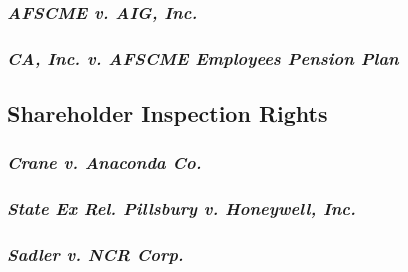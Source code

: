 
\subsubsection{\emph{AFSCME v. AIG, Inc.}}


\subsubsection{\emph{CA, Inc. v. AFSCME Employees Pension Plan}}


\subsection{Shareholder Inspection Rights}


\subsubsection{\emph{Crane v. Anaconda Co.}}


\subsubsection{\emph{State Ex Rel. Pillsbury v. Honeywell, Inc.}}


\subsubsection{\emph{Sadler v. NCR Corp.}}

